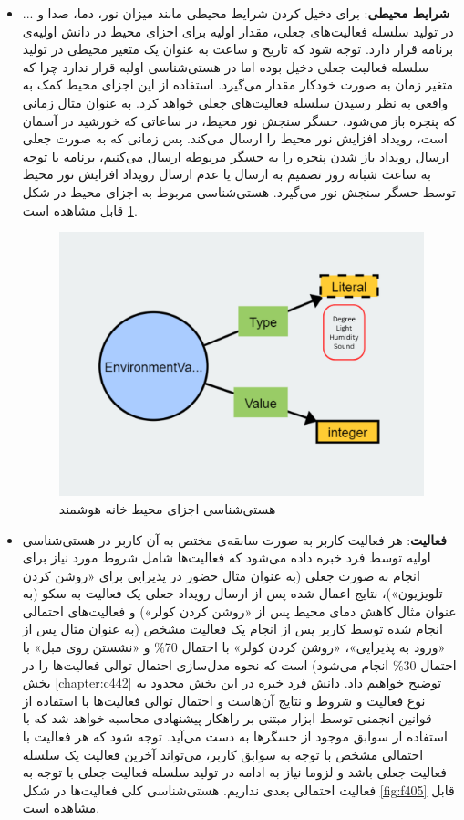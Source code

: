 \begin{itemize}
\item \textbf{شرایط محیطی}: برای دخیل کردن شرایط محیطی مانند میزان نور، دما، صدا و ... در تولید سلسله فعالیت‌های جعلی، مقدار اولیه برای اجزای محیط در دانش اولیه‌ی برنامه قرار دارد. توجه شود که تاریخ و ساعت به عنوان یک متغیر محیطی در تولید سلسله فعالیت جعلی دخیل بوده اما در هستی‌شناسی اولیه قرار ندارد چرا که متغیر زمان به صورت خودکار مقدار می‌گیرد. استفاده از این اجزای محیط کمک به واقعی به نظر رسیدن سلسله فعالیت‌های جعلی خواهد کرد. به عنوان مثال زمانی که پنجره باز می‌شود، حسگر سنجش نور محیط، در ساعاتی که خورشید در آسمان است، رویداد افزایش نور محیط را ارسال می‌کند. پس زمانی که به صورت جعلی ارسال رویداد باز شدن پنجره را به حسگر مربوطه ارسال می‌کنیم، برنامه با توجه به ساعت شبانه روز تصمیم به ارسال یا عدم ارسال رویداد افزایش نور محیط توسط حسگر سنجش نور می‌گیرد. هستی‌شناسی مربوط به اجزای محیط در شکل \ref{fig:f404} قابل مشاهده است.

\begin{figure}[htp]
\centerline{\includegraphics[width=1\textwidth]{figs/f404.png}}
\caption{هستی‌شناسی اجزای محیط خانه هوشمند}
\label{fig:f404}
\end{figure}


\item \textbf{فعالیت}: هر فعالیت کاربر به صورت سابقه‌ی مختص به آن کاربر در هستی‌شناسی اولیه توسط فرد خبره داده می‌شود که فعالیت‌ها شامل شروط مورد نیاز برای انجام به صورت جعلی (به عنوان مثال حضور در پذیرایی برای «روشن کردن تلویزیون»)، نتایج اعمال شده پس از ارسال رویداد جعلی یک فعالیت به سکو (به عنوان مثال کاهش دمای محیط پس از «روشن کردن کولر») و فعالیت‌های احتمالی انجام شده توسط کاربر پس از انجام یک فعالیت مشخص (به عنوان مثال پس از «ورود به پذیرایی»، «روشن کردن کولر» با احتمال 70\% و «نشستن روی مبل» با احتمال 30\% انجام می‌شود) است که نحوه مدل‌سازی احتمال توالی فعالیت‌ها را در بخش \ref{chapter:c442} توضیح خواهیم داد. دانش فرد خبره در این بخش محدود به نوع فعالیت و شروط و نتایج آن‌هاست و احتمال توالی فعالیت‌ها با استفاده از قوانین انجمنی توسط ابزار مبتنی بر راهکار پیشنهادی محاسبه خواهد شد که با استفاده از سوابق موجود از حسگرها به دست می‌آید. توجه شود که هر فعالیت با احتمالی مشخص با توجه به سوابق کاربر، می‌تواند آخرین فعالیت یک سلسله فعالیت جعلی باشد و لزوما نیاز به ادامه در تولید سلسله فعالیت جعلی با توجه به فعالیت احتمالی بعدی نداریم. هستی‌شناسی کلی فعالیت‌ها در شکل \ref{fig:f405} قابل مشاهده است. 


\end{itemize}
